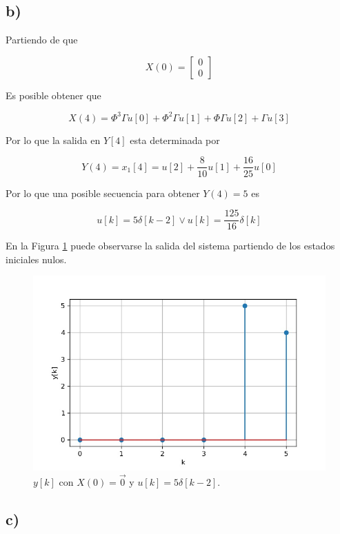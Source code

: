 \documentclass[11pt,a4paper]{article}
\begin{document}
    \subsection*{b)}

    Partiendo de que 

    \begin{equation}
        X(0) = 
        \begin{bmatrix}
            0 \\ 0
        \end{bmatrix}
    \end{equation}

    Es posible obtener que 

    \begin{equation}
        X(4) = \Phi^3 \Gamma u[0] + \Phi^2 \Gamma u[1] + \Phi \Gamma u[2] + \Gamma u[3] 
    \end{equation}

    Por lo que la salida en $Y[4]$ esta determinada por 

    \begin{equation}
        Y(4) = x_1[4] = u[2] + \frac{8}{10} u[1] + \frac{16}{25} u[0]
    \end{equation}

    Por lo que una posible secuencia para obtener $Y(4)=5$ es 

    \begin{equation}
        u[k] = 5 \delta[k-2] \lor u[k] = \frac{125}{16} \delta[k]
    \end{equation}

    En la Figura \ref{fig:2-b} puede observarse la salida del sistema partiendo de los estados iniciales nulos. 

    \begin{figure}
        \centering 
        \includegraphics[width=.5\textwidth]{Img/2-b.jpg}
        \caption{$y[k]$ con $X(0)=\vec{0}$ y $u[k]=5\delta[k-2]$.}
        \label{fig:2-b}
    \end{figure}

    \subsection*{c)}
\end{document}
